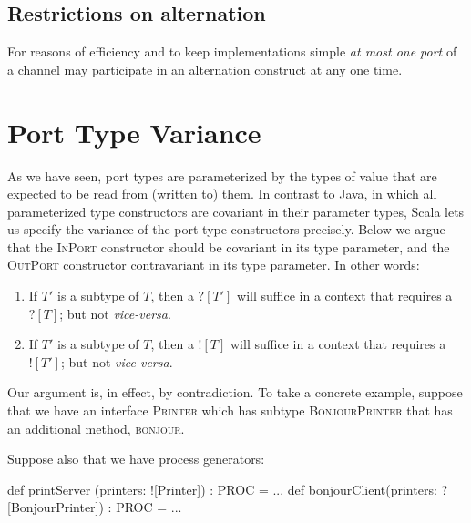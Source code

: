 \documentclass[12pt]{IOS-Book-Article-CPA-2017}
\begin{document}
\subsection{Restrictions on alternation}
For reasons of efficiency and to keep implementations simple \textit{at most
one port} of a channel may participate in an alternation 
construct at any one time.


\section{Port Type Variance}
As we have seen, port types are parameterized by the types of
value that are expected to be read from (written to) them.
In contrast to Java, in which all parameterized type constructors are 
covariant in their parameter types, Scala lets us specify the variance 
of the port type constructors precisely. 
%
Below we argue that the \textsc{InPort} constructor should be covariant in its type
parameter, and the \textsc{OutPort} constructor contravariant in its type 
parameter. In other words:

\begin{enumerate}
\item If $T'$ is a subtype of $T$, then a $?[T']$ will
suffice in a context that requires a  $?[T]$; but not \textit{vice-versa}.

\item If $T'$ is a subtype of $T$, then a $![T]$ will
suffice in a context that requires a  $![T']$; but not \textit{vice-versa}.
   
\end{enumerate}

Our argument is, in effect,  by contradiction. To take a concrete example, suppose that
we have an interface \textsc{Printer} which has subtype
\textsc{BonjourPrinter} that has an additional method, \textsc{bonjour}.

Suppose also that we have process generators: 
\begin{code}
        def printServer  (printers: ![Printer]) : PROC = ...
        def bonjourClient(printers: ?[BonjourPrinter]) : PROC = ...
\end{code}
\end{document}
